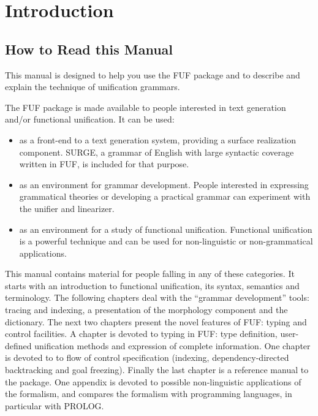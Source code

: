 \documentclass[10pt,a4paper]{report}
\begin{document}
\tableofcontents
\newpage
\listoffigures
\newpage

\chapter{Introduction}

\section{How to Read this Manual}

This manual is designed to help you use the FUF package and to
describe and explain the technique of unification grammars.

The FUF package is made available to people interested in text
generation and/or functional unification. It can be used:
\begin{itemize}
\item as a front-end to a text generation system, providing a surface realization
component.  SURGE, a grammar of English with large syntactic coverage
written in FUF, is included for that purpose.

\item as an environment for grammar development. People interested in
expressing grammatical theories or developing a practical grammar
can experiment with the unifier and linearizer.

\item as an environment for a study of functional unification.
Functional unification is a powerful technique and can be used
for non-linguistic or non-grammatical applications.
\end{itemize}

This manual contains material for people falling in any of these
categories. It starts with an introduction to functional unification, its
syntax, semantics and terminology. The following chapters deal with the
``grammar development'' tools: tracing and indexing, a presentation of the
morphology component and the dictionary.  The next two chapters present the
novel features of FUF: typing and control facilities.  A chapter is devoted
to typing in FUF: type definition, user-defined unification methods and
expression of complete information.  One chapter is devoted to to flow of
control specification (indexing, dependency-directed backtracking and goal
freezing).  Finally the last chapter is a reference manual to the package.
One appendix is devoted to possible non-linguistic applications of the
formalism, and compares the formalism with programming languages, in
particular with PROLOG.
\end{document}
